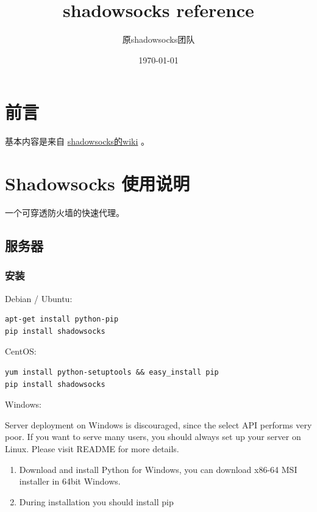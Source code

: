 \documentclass[11pt,a4paper]{sphinxmanual}
\author{原shadowsocks团队}
\date{\today}
\title{shadowsocks reference}
\begin{document}
\maketitle
\tableofcontents



\chapter{前言}
\label{sec-1}
基本内容是来自 \href{https://github.com/shadowsocks/shadowsocks/wiki}{shadowsocks的wiki} 。


\chapter{Shadowsocks 使用说明}
\label{sec-2}
一个可穿透防火墙的快速代理。

\section{服务器}
\label{sec-2-1}
\subsection{安装}
\label{sec-2-1-1}
Debian / Ubuntu:
\begin{verbatim}
apt-get install python-pip
pip install shadowsocks
\end{verbatim}

CentOS:
\begin{verbatim}
yum install python-setuptools && easy_install pip
pip install shadowsocks
\end{verbatim}

Windows:

Server deployment on Windows is discouraged, since the select API performs very poor. If you want to serve many users, you should always set up your server on Linux. Please visit README for more details.

\begin{enumerate}
\item Download and install Python for Windows, you can download x86-64 MSI installer in 64bit Windows.
\item During installation you should install pip
\end{enumerate}
\end{document}
